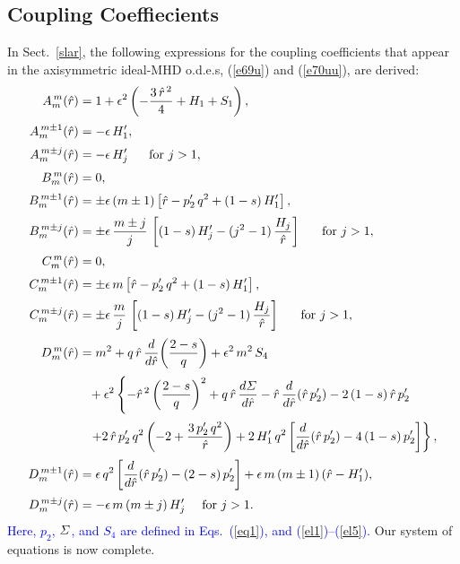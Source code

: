 \documentclass[12pt,prb,aps]{revtex4-1}
\begin{document}
\subsection{Coupling Coeffiecients}
In Sect.~\ref{slar}, the following expressions for the coupling coefficients that appear in the axisymmetric ideal-MHD o.d.e.s, (\ref{e69u}) and (\ref{e70uu}), are derived:
\begin{align}\label{c1}
A_m^{\,m}(\hat{r}) &= 1 + \epsilon^2\left(-\frac{3\,\hat{r}^{\,2}}{4} + H_1+S_1\right),\\[0.5ex]
A_m^{\,m\pm 1}(\hat{r}) &= - \epsilon\,H_1',\\[0.5ex]
A_m^{\,m\pm j}(\hat{r}) &= -\epsilon\,H_j'~~~~~\mbox{for $j>1$},\\[0.5ex]
B_m^{\,m}(\hat{r}) &= 0,\\[0.5ex]
B_m^{\,m\pm 1}(\hat{r}) &= \pm \epsilon\,(m\pm 1)\left[\hat{r}-p_2'\,q^2+(1-s)\,H_1'\right],\\[0.5ex]
B_m^{\,m\pm j}(\hat{r}) &= \pm\epsilon\,\frac{m\pm j}{j}\,\left[(1-s)\,H_j'- (j^2-1)\,\frac{H_j}{\hat{r}}\right]~~~~~\mbox{for $j>1$},\\[0.5ex]
C_m^{\,m}(\hat{r}) &= 0,\\[0.5ex]
C_m^{\,m\pm 1}(\hat{r}) &= \pm \epsilon\,m\left[\hat{r}-p_2'\,q^2+(1-s)\,H_1'\right],\\[0.5ex]
C_m^{\,m\pm j}(\hat{r}) &= \pm\epsilon\,\frac{m}{j}\,\left[(1-s)\,H_j'- (j^2-1)\,\frac{H_j}{\hat{r}}\right]~~~~~\mbox{for $j>1$},\\[0.5ex]
D_m^{\,m}(\hat{r}) &= m^2 + q\,\hat{r}\,\frac{d}{d\hat{r}}\!\left(\frac{2-s}{q}\right) +\epsilon^2\,m^2\,S_4\nonumber\\[0.5ex]
&\phantom{=}+\epsilon^2\left\{-\hat{r}^{\,2}\left(\frac{2-s}{q}\right)^2+q\,\hat{r}\,\frac{d{\mit\Sigma}}{d\hat{r}}- \hat{r}\,\frac{d}{d\hat{r}}(\hat{r}\,p_2') -2\,(1-s)\,\hat{r}\,p_2'
\right.\nonumber\\[0.5ex]
&\phantom{=}\left.+2\,\hat{r}\,p_2'\,q^2\left(-2 + \frac{3\,p_2'\,q^2}{\hat{r}}\right) + 2\,H_1'\,q^2\left[\frac{d}{d\hat{r}}(\hat{r}\,p_2')-4\,(1-s)\,p_2'\right]\right\},\\[0.5ex]
D_m^{\,m\pm 1}(\hat{r}) &=\epsilon\,q^2\left[\frac{d}{d\hat{r}}(\hat{r}\,p_2') - (2-s)\,p_2'\right] + \epsilon\,m\,(m\pm 1)\,(\hat{r}-H_1'),\\[0.5ex]
D_m^{\,m\pm j}(\hat{r}) &= -\epsilon\,m\,(m\pm j)\,H_j'~~~~\mbox{for $j>1$}.\label{cm1}
\end{align}
\textcolor{blue}{Here, $p_2$, ${\mit\Sigma}$, and $S_4$ are defined in Eqs.~(\ref{eq1}), and (\ref{el1})--(\ref{el5}). }
Our system of equations is now complete. 
\end{document}
